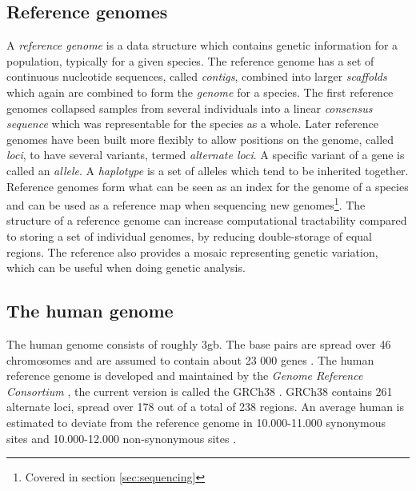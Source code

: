\documentclass[thesis.tex]{subfiles}
\begin{document}
\subsection{Reference genomes}
A \textit{reference genome} is a data structure which contains genetic information for a population, typically for a given species. The reference genome has a set of continuous nucleotide sequences, called \textit{contigs}, combined into larger \textit{scaffolds} which again are combined to form the \textit{genome} for a species. The first reference genomes collapsed samples from several individuals into a linear \textit{consensus sequence} which was representable for the species as a whole. Later reference genomes have been built more flexibly to allow positions on the genome, called \textit{loci}, to have several variants, termed \textit{alternate loci}. A specific variant of a gene is called an \textit{allele}. A \textit{haplotype} is a set of alleles which tend to be inherited together. Reference genomes form what can be seen as an index for the genome of a species and can be used as a reference map when sequencing new genomes\footnote{Covered in section \ref{sec:sequencing}}. The structure of a reference genome can increase computational tractability compared to storing a set of individual genomes, by reducing double-storage of equal regions. The reference also provides a mosaic representing genetic variation, which can be useful when doing genetic analysis.\\
\par\noindent
\subsection{The human genome}
\label{sec:human_genome}
The human genome consists of roughly 3gb. The base pairs are spread over 46 chromosomes and are assumed to contain about 23 000 genes \cite{introduction_to_genomics}. The human reference genome is developed and maintained by the \textit{Genome Reference Consortium} \cite{genome_reference_consortium}, the current version is called the GRCh38 \cite{grch38}. GRCh38 contains 261 alternate loci, spread over 178 out of a total of 238 regions. An average human is estimated to deviate from the reference genome in 10.000-11.000 synonymous sites and 10.000-12.000 non-synonymous sites \cite{a_map_of_human_genome_variation_from_population_scale_sequencing}.
\end{document}
